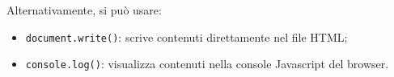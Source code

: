 \documentclass[a4paper,11pt]{article}
\begin{document}
Alternativamente, si può usare:
\begin{itemize}
	\item \lstinline|document.write()|: scrive contenuti direttamente nel file HTML;
	\item \lstinline|console.log()|: visualizza contenuti nella console Javascript del browser.
\end{itemize}
\end{document}
